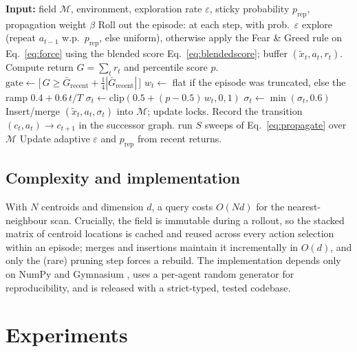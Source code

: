\documentclass[11pt]{article}
\newcommand{\NWM}{\textsc{NWM}}
\begin{document}
\begin{algorithm}[t]
\caption{\NWM{} training episode}
\label{alg:nwm}
\begin{algorithmic}[1]
\State \textbf{Input:} field $\mathcal{M}$, environment, exploration rate $\varepsilon$,
sticky probability $p_{\text{rep}}$, propagation weight $\beta$
\State Roll out the episode: at each step, with prob.\ $\varepsilon$ explore
(repeat $a_{t-1}$ w.p.\ $p_{\text{rep}}$, else uniform), otherwise apply the
Fear \& Greed rule on Eq.~\eqref{eq:force} using the blended score
Eq.~\eqref{eq:blendedscore}; buffer $(\tilde x_t, a_t, r_t)$.
\State Compute return $G=\sum_t r_t$ and percentile score $p$.
\State $\mathrm{gate}\gets\bigl[\,G\ge\bar G_{\text{recent}}+\tfrac14|\bar G_{\text{recent}}|\,\bigr]$
\State $w_t\gets$ flat if the episode was truncated, else the ramp $0.4+0.6\,t/T$
  \State $\sigma_t\gets\mathrm{clip}(0.5+(p-0.5)\,w_t,0,1)$
   $\sigma_t\gets\min(\sigma_t,0.6)$ \EndIf
  \State Insert/merge $(\tilde x_t,a_t,\sigma_t)$ into $\mathcal{M}$; update locks.
  \State Record the transition $(c_{t},a_t)\!\to\!c_{t+1}$ in the successor graph.
\EndFor
{} run $S$ sweeps of Eq.~\eqref{eq:propagate} over $\mathcal{M}$ \EndIf
\State Update adaptive $\varepsilon$ and $p_{\text{rep}}$ from recent returns.
\end{algorithmic}
\end{algorithm}

\subsection{Complexity and implementation}
With $N$ centroids and dimension $d$, a query costs $O(Nd)$ for the
nearest-neighbour scan. Crucially, the field is immutable during a rollout, so
the stacked matrix of centroid locations is cached and reused across every
action selection within an episode; merges and insertions maintain it
incrementally in $O(d)$, and only the (rare) pruning step forces a rebuild. The
implementation depends only on NumPy \citep{harris2020array} and Gymnasium
\citep{towers2024gymnasium}, uses a per-agent random generator for
reproducibility, and is released with a strict-typed, tested codebase.

\section{Experiments}
\label{sec:experiments}
\end{document}
